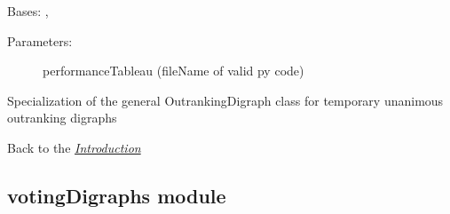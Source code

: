 \documentclass[letterpaper,10pt,english]{sphinxmanual}
\begin{document}
\begin{fulllineitems}
\label{techDoc:outrankingDigraphs.UnanimousOutrankingDigraph}
Bases: {\hyperref[techDoc:outrankingDigraphs.OutrankingDigraph]{}}, {\hyperref[techDoc:perfTabs.PerformanceTableau]{}}
\begin{description}
\item[{Parameters:}] \leavevmode
performanceTableau (fileName of valid py code)

\end{description}

Specialization of the general OutrankingDigraph class for 
temporary unanimous outranking digraphs

\end{fulllineitems}


Back to the {\hyperref[techDoc:introduction-label]{\emph{Introduction}}}


\subsection{votingDigraphs module}
\label{techDoc:votingdigraphs-label}\label{techDoc:module-votingDigraphs}\label{techDoc:votingdigraphs-module}
\end{document}
